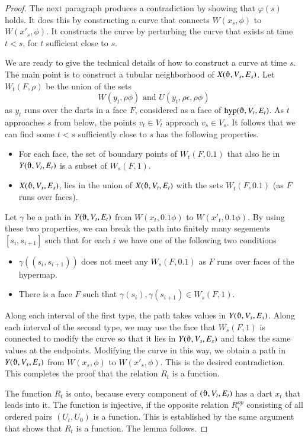 \begin{proof}
The next paragraph produces a contradiction
by showing that $\varphi(s)$ holds.  It does this by
constructing a curve that connects $W(x_s,\phi)$ to $W(x'_s,\phi)$.
It constructs the curve by perturbing the curve that
exists at time $t<s$, for $t$ sufficient close to $s$.  

We are ready to give the technical details of how to construct
a curve at time $s$.  The main point is to construct
a tubular neighborhood of $X(\orgn,V_s,E_s)$.
Let $W_t(F,\rho)$ be the union of the sets
   $$W(y_t,\rho\phi) \text{ and } U(y_t,\rho\epsilon,\rho\phi)$$
as $y_t$ runs over the darts in a face $F$, considered as a face
of $\op{hyp}(\orgn,V_t,E_t)$.
As $t$ approaches $s$ from below, the points $v_t\in V_t$
approach $v_s\in V_s$.  It follows that we can find
some $t<s$ sufficiently close to $s$ has the
following properties.
\begin{itemize}
 \item For each face, the set of boundary points of $W_t(F,0.1)$ that
   also lie in $Y(\orgn,V_t,E_t)$ is a subset of $W_s(F,1)$.
 \item  $X(\orgn,V_s,E_s)$, lies in the union of $X(\orgn,V_t,E_t)$ with
  the
  sets $W_t(F,0.1)$ (as $F$ runs over faces).
\end{itemize}
Let $\gamma$ be a path in $Y(\orgn,V_t,E_t)$ from $W(x_t,0.1 \phi)$
to $W(x'_t,0.1 \phi)$.  By using these two properties, 
we can break the path into finitely many
segements $[s_i,s_{i+1}]$ such that for each $i$ we have one
of the following two conditions
\begin{itemize} 
\item
$\gamma({(s_i,s_{i+1})})$ does not meet any
$W_s(F,0.1)$ as $F$ runs over faces of the hypermap.
\item There is a face $F$ such that
$\gamma(s_i), \gamma(s_{i+1})\in W_s(F,1)$.
\end{itemize}
Along each interval of the first type, the path takes values in
$Y(\orgn,V_s,E_s)$.  Along each interval of the second type,
we may use the face that $W_s(F,1)$ is connected to modify
the curve so that it lies in $Y(\orgn,V_s,E_s)$ and takes
the same values at the endpoints.  Modifying the curve in this way,
we obtain a path in $Y(\orgn,V_s,E_s)$
from $W(x_s,\phi)$ to $W(x'_s,\phi)$.  This is the desired
contradiction.  This completes
the proof that the relation $R_t$ is a function.

The function $R_t$ is onto, because every component of $(\orgn,V_t,E_t)$
has a dart $x_t$ that leads into it.  The function is injective,
if the opposite relation $R_t^{op}$ consisting of all ordered pairs
$(U_t,U_0)$ is a function.  This is established by the same argument
that shows that $R_t$ is a function.  The lemma follows. 
\end{proof}

